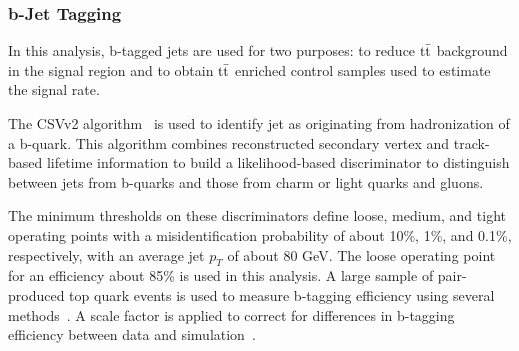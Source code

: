 \subsubsection{b-Jet Tagging}

In this analysis, b-tagged jets are used for two purposes: to reduce $\rm{t\bar{t}}$ background in the signal region and to obtain $\rm{t\bar{t}}$ enriched 
control samples used to estimate the signal rate.

The CSVv2 algorithm~\cite{Chatrchyan:2012jua} is used to identify jet as originating from hadronization of a b-quark. This algorithm combines 
reconstructed secondary vertex and track-based lifetime information to build a likelihood-based discriminator to distinguish between jets from b-quarks and those 
from charm or light quarks and gluons.

The minimum thresholds on these discriminators define loose, medium, and tight operating points with a misidentification probability of about 10\%, 1\%, and 
0.1\%, respectively, with an average jet $p_T$ of about 80 GeV. The loose operating point for an efficiency about 85\% is used in this analysis.
A large sample of pair-produced top quark events is used to measure b-tagging efficiency using several methods~\cite{CMS-PAS-BTV-13-001}. A scale factor is 
applied to correct for differences in b-tagging efficiency between data and simulation~\cite{bTagging}.
